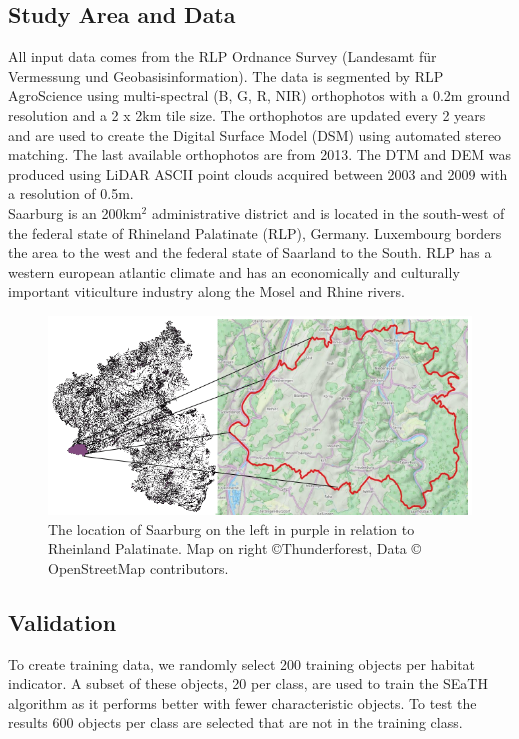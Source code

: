 \documentclass[authoryear, review,12pt,number]{elsarticle}
\begin{document}
\subsection{Study Area and Data}
All input data comes from the RLP Ordnance Survey (Landesamt f\"ur Vermessung 
und Geobasisinformation). The data is segmented by RLP AgroScience using
multi-spectral (B, G, R, NIR) orthophotos with a 0.2m ground resolution and a
2 x 2km tile size. The orthophotos are updated every 2 years and are used to
create the Digital Surface Model (DSM) using automated stereo matching. The
last available orthophotos are from 2013. The DTM and
DEM was produced using LiDAR ASCII point clouds acquired between 2003 and 2009
with a resolution of 0.5m.\\
Saarburg is an 200km$^{2}$ administrative district and is located
in the south-west of the federal state of Rhineland Palatinate (RLP), Germany.
Luxembourg borders the area to the west and the federal state of Saarland to the South.
RLP has a western european atlantic climate and has an
economically and culturally important viticulture industry along the Mosel and
Rhine rivers. 
\begin{figure}
	\includegraphics[width=\textwidth]{diagrams/study_area_closeup.png}
	\caption{The location of Saarburg on the left in purple in relation to 
Rheinland Palatinate. Map on right \copyright Thunderforest, Data \copyright 
OpenStreetMap contributors.}
\end{figure}

\subsection{Validation}
To create training data, we randomly select 200 training objects per habitat
indicator. A subset of these objects, 20 per class, are used to train the SEaTH
algorithm as it performs better with fewer characteristic objects. To test the 
results 600 objects per class are selected that are not in the training class.
\end{document}
